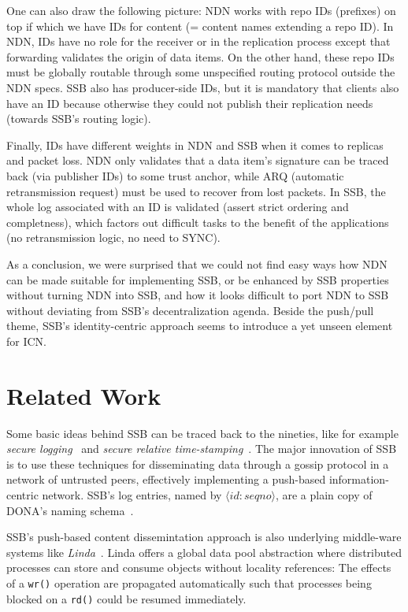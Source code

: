 \documentclass[10pt,sigconf,rewiew]{acmart}
\begin{document}
One can also draw the following picture: NDN works with repo IDs
(prefixes) on top if which we have IDs for content (= content names
extending a repo ID). In NDN, IDs have no role for the receiver or in
the replication process except that forwarding validates the origin of
data items. On the other hand, these repo IDs must be globally routable
through some unspecified routing protocol outside the NDN specs. SSB
also has producer-side IDs, but it is mandatory that clients also have
an ID because otherwise they could not publish their replication needs
(towards SSB's routing logic).

Finally, IDs have different weights in NDN and SSB when it comes to
replicas and packet loss. NDN only validates that a data item's
signature can be traced back (via publisher IDs) to some trust anchor,
while ARQ (automatic retransmission request) must be used to recover
from lost packets. In SSB, the whole log associated with an ID is
validated (assert strict ordering and completness), which factors out
difficult tasks to the benefit of the applications (no retransmission
logic, no need to SYNC).

As a conclusion, we were surprised that we could not find easy ways
how NDN can be made suitable for implementing SSB, or be enhanced by
SSB properties without turning NDN into SSB, and how it looks
difficult to port NDN to SSB without deviating from SSB's
decentralization agenda. Beside the push/pull theme, SSB's
identity-centric approach seems to introduce a yet unseen element for
ICN.


\section{Related Work}
\label{sect:relwork}

Some basic ideas behind SSB can be traced back to the nineties, like
for example {\em secure logging}~\cite{schneier1998cryptographic} and {\em secure
relative time-stamping}~\cite{haber1990time}. The major innovation of
SSB is to use these techniques for disseminating data through a gossip
protocol in a network of untrusted peers, effectively implementing a
push-based information-centric network. SSB's log entries, named by $\langle id:seqno\rangle$, are a plain copy of DONA's naming schema~\cite{Koponen:2007:DNA:1282380.1282402}.

SSB's push-based content dissemintation approach is also
underlying middle-ware systems like
{\em Linda}~\cite{Gelernter:1985:GCL:2363.2433}. Linda offers a global data
pool abstraction where distributed processes can store and consume
objects without locality references: The effects of a {\tt wr()}
operation are propagated automatically such that processes being
blocked on a {\tt rd()} could be resumed immediately.
\end{document}
